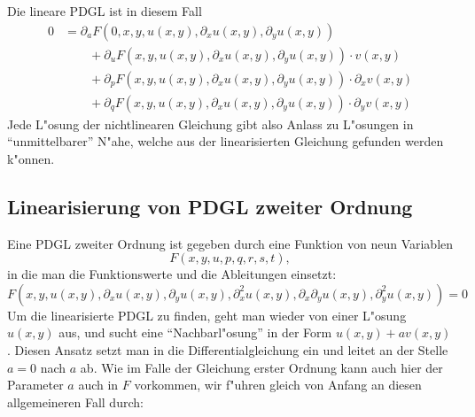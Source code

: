 Die lineare PDGL ist in diesem Fall
\begin{align*}
0
&=
\partial_aF(0,x,y,u(x,y),\partial_xu(x,y),\partial_yu(x,y))
\\
&\qquad
+
\partial_uF(x,y,u(x,y),\partial_xu(x,y),\partial_yu(x,y))\cdot v(x,y)
\\
&\qquad
+
\partial_pF(x,y,u(x,y),\partial_xu(x,y),\partial_yu(x,y))\cdot \partial_xv(x,y)
\\
&\qquad
+
\partial_qF(x,y,u(x,y),\partial_xu(x,y),\partial_yu(x,y))\cdot \partial_yv(x,y)
\end{align*}
Jede L"osung der nichtlinearen Gleichung gibt also Anlass zu L"osungen
in ``unmittelbarer'' N"ahe, welche aus der linearisierten Gleichung
gefunden werden k"onnen.

\subsection{Linearisierung von PDGL zweiter Ordnung}
Eine PDGL zweiter Ordnung ist gegeben durch eine Funktion von neun
Variablen
\[
F(x,y,u,p,q,r,s,t),
\]
in die man die Funktionswerte und die Ableitungen einsetzt:
\[
F(x,y,u(x,y), \partial_xu(x,y),\partial_yu(x,y),
\partial_x^2u(x,y),
\partial_x\partial_yu(x,y),
\partial_y^2u(x,y))
=0
\]
Um die linearisierte PDGL zu finden, geht man wieder von einer
L"osung $u(x,y)$ aus, und sucht eine ``Nachbarl"osung'' in der
Form $u(x,y)+av(x,y)$. Diesen Ansatz setzt man in die 
Differentialgleichung ein und leitet an der Stelle $a=0$
nach $a$ ab. Wie im Falle der Gleichung erster Ordnung kann auch
hier der Parameter $a$ auch in $F$ vorkommen, wir f"uhren gleich
von Anfang an diesen allgemeineren Fall  durch:
